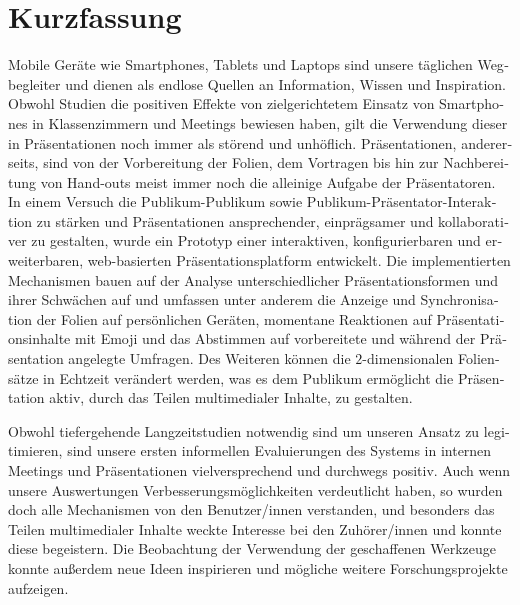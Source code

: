 \chapter{Kurzfassung}

\begin{german}
Mobile Geräte wie Smartphones, Tablets und Laptops sind unsere täglichen Wegbegleiter und dienen als endlose Quellen an Information, Wissen und Inspiration. Obwohl Studien die positiven Effekte von zielgerichtetem Einsatz von Smartphones in Klassenzimmern und Meetings bewiesen haben, gilt die Verwendung dieser in Präsentationen noch immer als störend und unhöflich. Präsentationen, andererseits, sind von der Vorbereitung der Folien, dem Vortragen bis hin zur Nachbereitung von Hand-outs meist immer noch die alleinige Aufgabe der Präsentatoren. In einem Versuch die Publikum-Publikum sowie Publikum-Präsentator-Interaktion zu stärken und Präsentationen ansprechender, einprägsamer und kollaborativer zu gestalten, wurde ein Prototyp einer interaktiven, konfigurierbaren und erweiterbaren, web-basierten Präsentationsplatform entwickelt. Die implementierten Mechanismen bauen auf der Analyse unterschiedlicher Präsentationsformen und ihrer Schwächen auf und umfassen unter anderem die Anzeige und Synchronisation der Folien auf persönlichen Geräten, momentane Reaktionen auf Präsentationsinhalte mit Emoji und das Abstimmen auf vorbereitete und während der Präsentation angelegte Umfragen. Des Weiteren können die $2$-dimensionalen Foliensätze in Echtzeit verändert werden, was es dem Publikum ermöglicht die Präsentation aktiv, durch das Teilen multimedialer Inhalte, zu gestalten.

Obwohl tiefergehende Langzeitstudien notwendig sind um unseren Ansatz zu legitimieren, sind unsere ersten informellen Evaluierungen des Systems in internen Meetings und Präsentationen vielversprechend und durchwegs positiv. Auch wenn unsere Auswertungen Verbesserungsmöglichkeiten verdeutlicht haben, so wurden doch alle Mechanismen von den Benutzer/innen verstanden, und besonders das Teilen multimedialer Inhalte weckte Interesse bei den Zuhörer/innen und konnte diese begeistern. Die Beobachtung der Verwendung der geschaffenen Werkzeuge konnte außerdem neue Ideen inspirieren und mögliche weitere Forschungsprojekte aufzeigen.
\end{german}